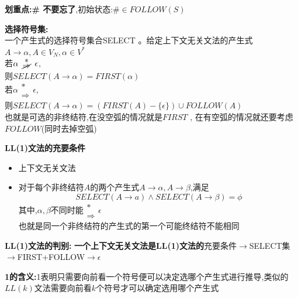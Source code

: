 \documentclass[UTF8,a4paper]{ctexart}
\newcommand{\spaceline}{\vspace{\baselineskip}}
\begin{document}
\textbf{划重点:\# 不要忘了},初始状态:$\# \in FOLLOW(S)$

\spaceline
\textbf{选择符号集:}\\
一个产生式的选择符号集合SELECT 。给定上下文无关文法的产生式\\
$A\to \alpha , A\in V_N , \alpha \in V^*$\\
若$\renewcommand{\arraystretch}{0.5} \alpha \begin{array}{c} * \\ \cancel{\Rightarrow} \end{array} \epsilon $,\\
则$SELECT(A \to \alpha) = FIRST(\alpha)$\\
若$\renewcommand{\arraystretch}{0.5} \alpha \begin{array}{c} * \\ \Rightarrow \end{array} \epsilon $,\\
则$SELECT(A \to \alpha) = (FIRST(A) - \{\epsilon\})\cup FOLLOW(A)$\\
{\color{blue} 也就是可选的非终结符,在没空弧的情况就是$FIRST$ , 在有空弧的情况就还要考虑$FOLLOW$(同时去掉空弧)}

\spaceline
\textbf{LL(1)文法的充要条件}
\begin{itemize}
 \item 上下文无关文法
 \item 对于每个非终结符$A$的两个产生式$A \to \alpha ,A \to \beta$,满足
       \[SELECT(A\to a) \land SELECT(A \to \beta) = \phi\]
       其中,$\alpha , \beta$不同时能$\renewcommand{\arraystretch}{0.5} \begin{array}{c} * \\ \Rightarrow \end{array} \epsilon$\\
       {\color{blue}也就是同一个非终结符的产生式的第一个可能终结符不能相同}
\end{itemize}

\spaceline
\textbf{LL(1)文法的判别:}
\textbf{一个上下文无关文法是LL(1)文法的}充要条件$\to$SELECT集$\to$FIRST+FOLLOW$\to$$\epsilon$

 \textbf{1的含义:}1表明只需要向前看一个符号便可以决定选哪个产生式进行推导,类似的$LL(k)$文法需要向前看$k$个符号才可以确定选用哪个产生式
\end{document}
